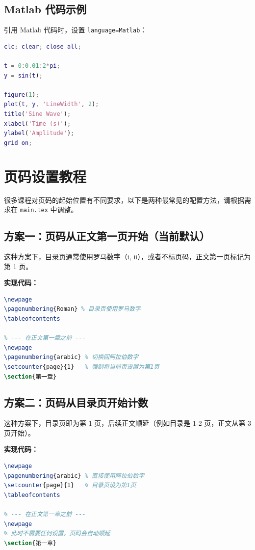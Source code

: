 \documentclass[12pt,hyperref,a4paper,UTF8,fontset=fandol]{ctexart}
\begin{document}
\subsection{Matlab 代码示例}
引用 Matlab 代码时，设置 \texttt{language=Matlab}：

\begin{lstlisting}[language=Matlab, caption={Matlab 绘图脚本}, label={code:matlab}]
% 清除工作区
clc; clear; close all;

t = 0:0.01:2*pi;
y = sin(t);

figure(1);
plot(t, y, 'LineWidth', 2);
title('Sine Wave');
xlabel('Time (s)');
ylabel('Amplitude');
grid on;
\end{lstlisting}

\section{页码设置教程}
很多课程对页码的起始位置有不同要求，以下是两种最常见的配置方法，请根据需求在 \texttt{main.tex} 中调整。

\subsection{方案一：页码从正文第一页开始（当前默认）}
这种方案下，目录页通常使用罗马数字（i, ii），或者不标页码，正文第一页标记为第 1 页。

\textbf{实现代码：}
\begin{lstlisting}[language=TeX]
% --- 在目录页之前 ---
\newpage
\pagenumbering{Roman} % 目录页使用罗马数字
\tableofcontents

% --- 在正文第一章之前 ---
\newpage
\pagenumbering{arabic} % 切换回阿拉伯数字
\setcounter{page}{1}   % 强制将当前页设置为第1页
\section{第一章}
\end{lstlisting}

\subsection{方案二：页码从目录页开始计数}
这种方案下，目录页即为第 1 页，后续正文顺延（例如目录是 1-2 页，正文从第 3 页开始）。

\textbf{实现代码：}
\begin{lstlisting}[language=TeX]
% --- 在目录页之前 ---
\newpage
\pagenumbering{arabic} % 直接使用阿拉伯数字
\setcounter{page}{1}   % 目录页设为第1页
\tableofcontents

% --- 在正文第一章之前 ---
\newpage
% 此时不需要任何设置，页码会自动顺延
\section{第一章}
\end{lstlisting}
\end{document}
